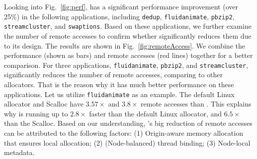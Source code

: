 Looking into Fig.~\ref{fig:perf}, \NM{} has a significant performance improvement (over 25\%) in the following applications, including \texttt{dedup}, \texttt{fluidanimate}, \texttt{pbzip2}, \texttt{streamcluster}, and \texttt{swaptions}. Based on these applications, we further examine the number of remote accesses to confirm whether \NM{} significantly reduces them due to its design. 
The results are shown in Fig.~\ref{fig:remoteAccess}. We combine the performance (shown as bars) and remote accesses (red lines) together for a better comparison. 
For three applications, \texttt{fluidanimate}, \texttt{pbzip2}, and \texttt{streamcluster}, \NM{}  significantly reduces the number of remote accesses, comparing to other allocators. That is the reason why it has much better performance on these applications. Let us utilize \texttt{fluidanimate} as an example. The default Linux allocator and Scalloc 
have $3.57\times$ and $3.8\times$ remote accesses than \NM{}. This explains why \NM{} is running up to $2.8\times$ faster than the default Linux allocator, and $6.5\times$ than the Scalloc. 
Based on our understanding, \NM{}'s big reduction of remote accesses can be attributed to the following factors: (1) Origin-aware memory allocation that ensures local allocation; (2) (Node-balanced) thread binding; (3) Node-local metadata. 

